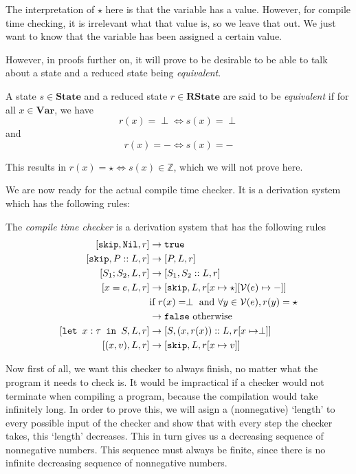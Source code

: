 The interpretation of $\star$ here is that the variable has a value. However, for compile time checking, it is irrelevant what that value is, so we leave that out. We just want to know that the variable has been assigned a certain value.

However, in proofs further on, it will prove to be desirable to be able to talk about a state and a reduced state being \emph{equivalent}.

\begin{definition}
A state $s\in\textbf{State}$ and a reduced state $r\in\textbf{RState}$ are said to be \emph{equivalent} if for all $x\in\textbf{Var}$, we have 
$$r(x) = \perp \iff s(x) = \perp$$
and
$$r(x) = - \iff s(x) = -$$
\end{definition}

This results in $r(x) = \star \iff s(x)\in \mathbb{Z}$, which we will not prove here. 

We are now ready for the actual compile time checker. It is a derivation system which has the following rules:

\begin{definition}
\label{compiletimechecker}
The \emph{compile time checker} is a derivation system that has the following rules
\begin{align*}
\cc{\texttt{skip}}{\texttt{Nil}}{r} & \to \texttt{true}  \\
\cc{\texttt{skip}} {P::L}{ r}       & \to \cc{P}{L}{r}  \\
\cc{S_1; S_2}{L}{r}                 & \to \cc{S_1}{S_2::L}{r}  \\
\cc{x=e}{L}{r}                     & \to \cc{\texttt{skip}}{L}{r[x\mapsto \star][\mathcal{V}(e) \mapsto -]} \\
                                    & \textrm{if }r(x) = \perp \textrm{ and } \forall y \in \mathcal{V}(e), r(y) = \star \\
                                    & \to \texttt{false} \textrm{ otherwise}\\
\cc{\letm{x}{S}}{L}{r} & \to \cc{S}{(x,r(x))::L}{r[x\mapsto \perp]} \\
\cc{(x,v)}{L}{r}                    & \to \cc{\texttt{skip}}{L}{r[x \mapsto v]}
\end{align*}
\end{definition}

Now first of all, we want this checker to always finish, no matter what the program it needs to check is. It would be impractical if a checker would not terminate when compiling a program, because the compilation would take infinitely long. In order to prove this, we will asign a (nonnegative) `length' to every possible input of the checker and show that with every step the checker takes, this `length' decreases. This in turn gives us a decreasing sequence of nonnegative numbers. This sequence must always be finite, since there is no infinite decreasing sequence of nonnegative numbers. 

